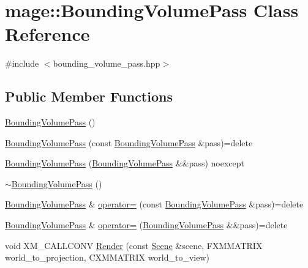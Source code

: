 \hypertarget{classmage_1_1_bounding_volume_pass}{}\section{mage\+:\+:Bounding\+Volume\+Pass Class Reference}
\label{classmage_1_1_bounding_volume_pass}


{\ttfamily \#include $<$bounding\+\_\+volume\+\_\+pass.\+hpp$>$}

\subsection*{Public Member Functions}
\begin{DoxyCompactItemize}
\item 
\hyperlink{classmage_1_1_bounding_volume_pass_ab32eb9086e463f5260f8999b78b55b26}{Bounding\+Volume\+Pass} ()
\item 
\hyperlink{classmage_1_1_bounding_volume_pass_a23b4f213c22b5649632dc51d2a0e91c1}{Bounding\+Volume\+Pass} (const \hyperlink{classmage_1_1_bounding_volume_pass}{Bounding\+Volume\+Pass} \&pass)=delete
\item 
\hyperlink{classmage_1_1_bounding_volume_pass_a1e1431a97fbdb04a793eac7da2fb5612}{Bounding\+Volume\+Pass} (\hyperlink{classmage_1_1_bounding_volume_pass}{Bounding\+Volume\+Pass} \&\&pass) noexcept
\item 
\hyperlink{classmage_1_1_bounding_volume_pass_a41dc433aed26f05e8b60462a6e337509}{$\sim$\+Bounding\+Volume\+Pass} ()
\item 
\hyperlink{classmage_1_1_bounding_volume_pass}{Bounding\+Volume\+Pass} \& \hyperlink{classmage_1_1_bounding_volume_pass_a7d4e1142dcdec337c2884ab305f6d1ac}{operator=} (const \hyperlink{classmage_1_1_bounding_volume_pass}{Bounding\+Volume\+Pass} \&pass)=delete
\item 
\hyperlink{classmage_1_1_bounding_volume_pass}{Bounding\+Volume\+Pass} \& \hyperlink{classmage_1_1_bounding_volume_pass_aa668ce31d98e83cab99184ea3289d85f}{operator=} (\hyperlink{classmage_1_1_bounding_volume_pass}{Bounding\+Volume\+Pass} \&\&pass)=delete
\item 
void X\+M\+\_\+\+C\+A\+L\+L\+C\+O\+NV \hyperlink{classmage_1_1_bounding_volume_pass_ad17f8f6c68d19ffa39e5a3dbe5737c86}{Render} (const \hyperlink{classmage_1_1_scene}{Scene} \&scene, F\+X\+M\+M\+A\+T\+R\+IX world\+\_\+to\+\_\+projection, C\+X\+M\+M\+A\+T\+R\+IX world\+\_\+to\+\_\+view)
\end{DoxyCompactItemize}
